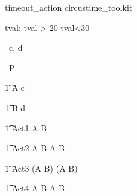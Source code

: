 \begin{zsection}
   \SECTION timeout\_action \parents circustime\_toolkit
\end{zsection}


\begin{axdef}
   tval: \nat
\where
   tval > 20 \land tval<30
\end{axdef}



\begin{circus}
   \circchannel\ c, d \\
\end{circus}

\begin{circus}
    \circprocess\ P \circdef \circbegin \\
\end{circus}

\begin{circusaction}
    	\t1 A \circdef c \then \Skip \\
\end{circusaction}

\begin{circusaction}
        \t1 B \circdef d \then \Skip \\
\end{circusaction}
                
\begin{circusaction}
        \t1 Act1 \circdef A \circtimeout {} \rcirctime B \\
\end{circusaction}

\begin{circusaction}         
	\t1 Act2 \circdef A \circtimeout {} \rcirctime B \circseq A \circtimeout {} \rcirctime B \\
\end{circusaction}

\begin{circusaction} 
        \t1 Act3 \circdef (A \circtimeout {} \rcirctime B) \circseq (A \circtimeout {} \rcirctime B) \\
\end{circusaction}

\begin{circusaction}
	\t1 Act4 \circdef A \circtimeout {} \rcirctime B \extchoice A \circtimeout {} \rcirctime B \\
\end{circusaction}

